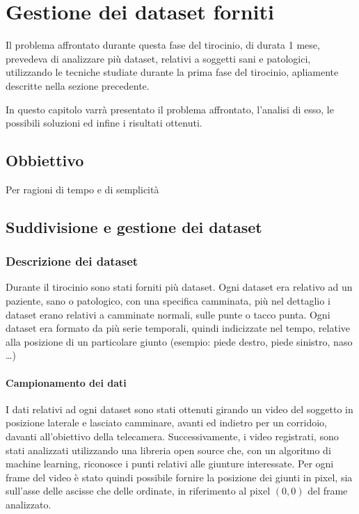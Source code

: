 \section{Gestione dei dataset forniti}
Il problema affrontato durante questa fase del tirocinio, di durata 1 mese, prevedeva di analizzare
più dataset, relativi a soggetti sani e patologici, utilizzando le tecniche
studiate durante la prima fase del tirocinio, apliamente descritte nella sezione
precedente.

In questo capitolo varrà presentato il problema affrontato, l'analisi di esso, le possibili soluzioni
ed infine i risultati ottenuti.

\subsection{Obbiettivo}
Per ragioni di tempo e di semplicità


\subsection{Suddivisione e gestione dei dataset}
\subsubsection{Descrizione dei dataset}
Durante il tirocinio sono stati forniti più dataset.
Ogni dataset era relativo ad un paziente, sano o patologico, con una specifica camminata,
più nel dettaglio i dataset erano relativi a camminate normali, sulle punte o tacco punta.
Ogni dataset era formato da più serie temporali, quindi indicizzate nel tempo, relative
alla posizione di un particolare giunto (esempio: piede destro, piede sinistro, naso \dots)

\paragraph{Campionamento dei dati} I dati relativi ad ogni dataset sono stati ottenuti girando un video del soggetto in posizione
laterale e lasciato camminare, avanti ed indietro per un corridoio, davanti all'obiettivo della telecamera. 
Successivamente, i video registrati, sono stati analizzati utilizzando una libreria open source che, con un algoritmo
di machine learning, riconosce i punti relativi alle giunture interessate. Per ogni frame del video
è stato quindi possibile fornire la posizione dei giunti in pixel, sia sull'asse delle
ascisse che delle ordinate, in riferimento al pixel $(0,0)$ del frame analizzato.

